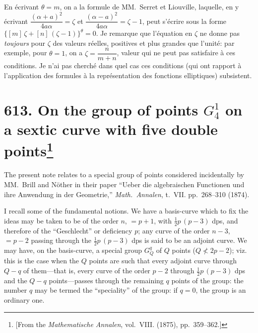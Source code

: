 \documentclass[11pt,a4paper]{article}
\theoremstyle{plain}
\theoremstyle{definition}
\theoremstyle{remark}
\begin{document}
En \'{e}crivant $\theta = m$, on a la formule de MM.~Serret et Liouville, laquelle, en y \'{e}crivant $\dfrac{(\alpha+a)^2}{4a\alpha} = \zeta$ et $\dfrac{(\alpha-a)^2}{4a\alpha} = \zeta - 1$, peut s'\'{e}crire sous la forme $\{[m]\,\zeta + [n]\,(\zeta-1)\}^\theta = 0$. Je remarque que l'\'{e}quation en $\zeta$ ne donne pas \textit{toujours} pour $\zeta$ des valeurs r\'{e}elles, positives et plus grandes que l'unit\'{e}: par exemple, pour $\theta = 1$, on a $\zeta = \dfrac{n}{m+n}$, valeur qui ne peut pas satisfaire \`{a} ces conditions. Je n'ai pas cherch\'{e} dans quel cas ces conditions (qui ont rapport \`{a} l'application des formules \`{a} la repr\'{e}sentation des fonctions elliptiques) subsistent.

\newpage
\section[On the group of points $G_4^1$ on a sextic curve with five double points]{\textbf{613.} On the group of points $G_4^1$ on a sextic curve with five double points\footnote{[From the \textit{Mathematische Annalen}, vol.~VIII. (1875), pp.~359--362.]}}

The present note relates to a special group of points considered incidentally by MM.~Brill and N\"{o}ther in their paper ``Ueber die algebraischen Functionen und ihre Anwendung in der Geometrie,'' \textit{Math.~Annalen}, t.~VII. pp.~268--310 (1874).

I recall some of the fundamental notions. We have a basis-curve which to fix the ideas may be taken to be of the order $n$, $= p+1$, with $\frac{1}{2}p\,(p-3)$ dps, and therefore of the ``Geschlecht'' or deficiency $p$; any curve of the order $n-3$, $= p-2$ passing through the $\frac{1}{2}p\,(p-3)$ dps is said to be an adjoint curve. We may have, on the basis-curve, a special group $G_Q^q$ of $Q$ points ($Q \nless 2p-2$); viz. this is the case when the $Q$ points are such that every adjoint curve through $Q-q$ of them---that is, every curve of the order $p-2$ through $\frac{1}{2}p\,(p-3)$ dps and the $Q-q$ points---passes through the remaining $q$ points of the group: the number $q$ may be termed the ``speciality'' of the group: if $q = 0$, the group is an ordinary one.
\end{document}

